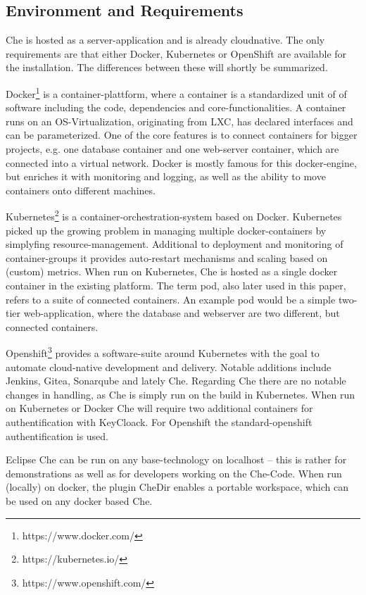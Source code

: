 \documentclass[utf8]{lni}
\begin{document}
\subsection{Environment and Requirements}
\label{subsec:Req}
Che is hosted as a server-application and is already cloudnative. 
The only requirements are that either Docker, Kubernetes or OpenShift are available for the installation.
The differences between these will shortly be summarized.
 
Docker\footnote{https://www.docker.com/} is a container-plattform, where a container is a standardized unit of of software including the code, dependencies and core-functionalities. 
A container runs on an OS-Virtualization, originating from LXC, has declared interfaces and can be parameterized. 
One of the core features is to connect containers for bigger projects, e.g. one 
database container and one web-server container, which are connected into a virtual network. 
Docker is mostly famous for this docker-engine, but enriches it with monitoring and logging, as well as the ability to move containers onto different machines.   

Kubernetes\footnote{https://kubernetes.io/} is a container-orchestration-system based on Docker. 
Kubernetes picked up the growing problem in managing multiple docker-containers by  simplyfing  resource-management. 
Additional to deployment and monitoring of container-groups it provides auto-restart mechanisms and scaling based on (custom) metrics. 
When run on Kubernetes, Che is hosted as a single docker container in the existing platform.
The term pod, also later used in this paper, refers to a suite of connected containers. 
An example pod would be a simple two-tier web-application, where the database and webserver are two different, but connected containers.

Openshift\footnote{https://www.openshift.com/} provides a software-suite around Kubernetes with the goal to automate cloud-native development and delivery.
Notable  additions  include  Jenkins,  Gitea,  Sonarqube and lately Che. 
Regarding Che there are no notable changes in handling, as Che is simply run on the build in Kubernetes.
When run on Kubernetes or Docker Che will require two additional containers for authentification with KeyCloack. 
For Openshift the standard-openshift authentification is used.  

Eclipse Che  can be run  on any  base-technology  on  localhost – this is rather for demonstrations as well as for developers working on the Che-Code. 
When run (locally) on docker, the plugin CheDir enables a portable workspace, 
which can be used on any docker based Che.
\end{document}
